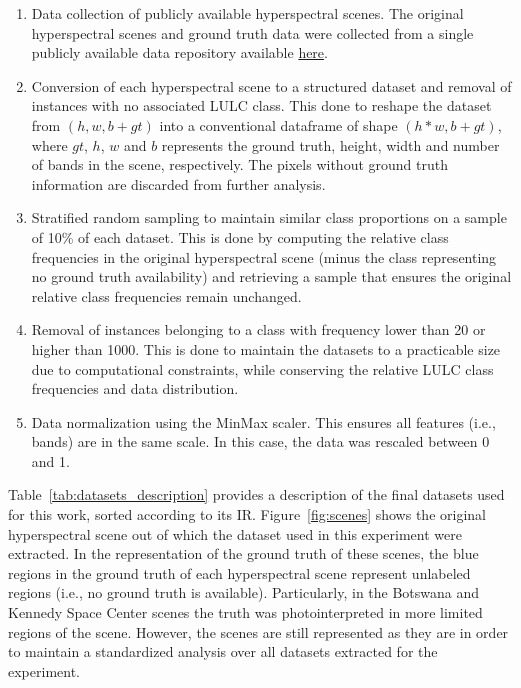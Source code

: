 \documentclass[information,article,submit,moreauthors,pdftex]{Definitions/mdpi}
\begin{document}
\begin{paracol}{2}
\begin{enumerate}
    
    \item Data collection of publicly available hyperspectral scenes.
        The original hyperspectral scenes and ground truth data were collected
        from a single publicly available data repository available
        \href{http://www.ehu.eus/ccwintco/index.php?title=Hyperspectral_Remote_Sensing_Scenes}{here}.

    \item Conversion of each hyperspectral scene to a structured
        dataset and removal of instances with no associated LULC class. This
        done to reshape the dataset from $(h,w,b+gt)$  into a conventional
        dataframe of shape $(h*w,b+gt)$, where $gt$, $h$, $w$ and $b$
        represents the ground truth, height, width and number of bands in the
        scene, respectively. The pixels without ground truth information are
        discarded from further analysis.

    \item Stratified random sampling to maintain similar class
        proportions on a sample of 10\% of each dataset. This is done by
        computing the relative class frequencies in the original hyperspectral
        scene (minus the class representing no ground truth availability) and
        retrieving a sample that ensures the original relative class
        frequencies remain unchanged.

    \item Removal of instances belonging to a class with frequency
        lower than 20 or higher than 1000. This is done to maintain the
        datasets to a practicable size due to computational constraints, while
        conserving the relative LULC class frequencies and data distribution. 

    \item Data normalization using the MinMax scaler. This ensures all
        features (i.e., bands) are in the same scale. In this case, the data
        was rescaled between 0 and 1.

\end{enumerate}

Table~\ref{tab:datasets_description} provides a description of the final
datasets used for this work, sorted according to its IR.
Figure~\ref{fig:scenes} shows the original hyperspectral scene out of which
the dataset used in this experiment were extracted. In the representation of
the ground truth of these scenes, the blue regions in the ground truth of each
hyperspectral scene represent unlabeled regions (i.e., no  ground truth is
available). Particularly, in the Botswana and Kennedy Space Center scenes the
truth was photointerpreted in more limited regions of the scene. However, the
scenes are still represented as they are in order to maintain a standardized
analysis over all datasets extracted for the experiment.

\end{paracol}
\end{document}
